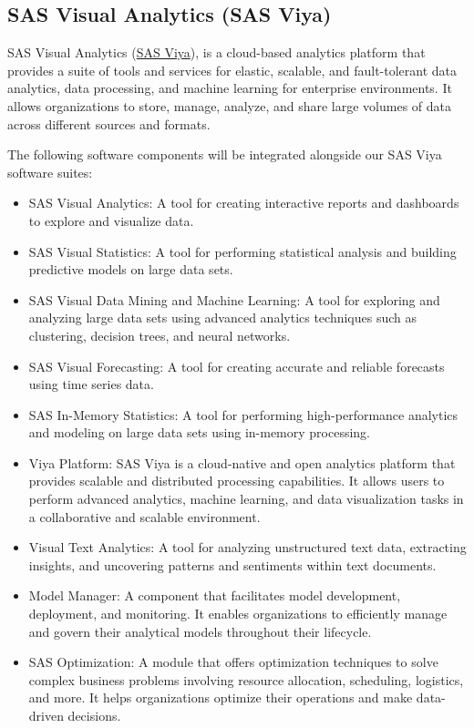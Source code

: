 \subsection{SAS Visual Analytics (SAS Viya)}
SAS Visual Analytics (\href{https://documentation.sas.com/doc/en/pgmsascdc/9.4_3.5/pgmsasgswlcm/home.htm}{SAS Viya}), is a cloud-based analytics platform that provides a suite of tools and services for elastic, scalable, and fault-tolerant data analytics, data processing, and machine learning for enterprise environments. It allows organizations to store, manage, analyze, and share large volumes of data across different sources and formats.

The following software components will be integrated alongside our SAS Viya software suites:

\begin{itemize}
    \item SAS Visual Analytics: A tool for creating interactive reports and dashboards to explore and visualize data.
    \item SAS Visual Statistics: A tool for performing statistical analysis and building predictive models on large data sets.
    \item SAS Visual Data Mining and Machine Learning: A tool for exploring and analyzing large data sets using advanced analytics techniques such as clustering, decision trees, and neural networks.
    \item SAS Visual Forecasting: A tool for creating accurate and reliable forecasts using time series data.
    \item SAS In-Memory Statistics: A tool for performing high-performance analytics and modeling on large data sets using in-memory processing.
    \item Viya Platform: SAS Viya is a cloud-native and open analytics platform that provides scalable and distributed processing capabilities. It allows users to perform advanced analytics, machine learning, and data visualization tasks in a collaborative and scalable environment.
    \item Visual Text Analytics: A tool for analyzing unstructured text data, extracting insights, and uncovering patterns and sentiments within text documents.
    \item Model Manager: A component that facilitates model development, deployment, and monitoring. It enables organizations to efficiently manage and govern their analytical models throughout their lifecycle.
    \item SAS Optimization: A module that offers optimization techniques to solve complex business problems involving resource allocation, scheduling, logistics, and more. It helps organizations optimize their operations and make data-driven decisions.

\end{itemize}
